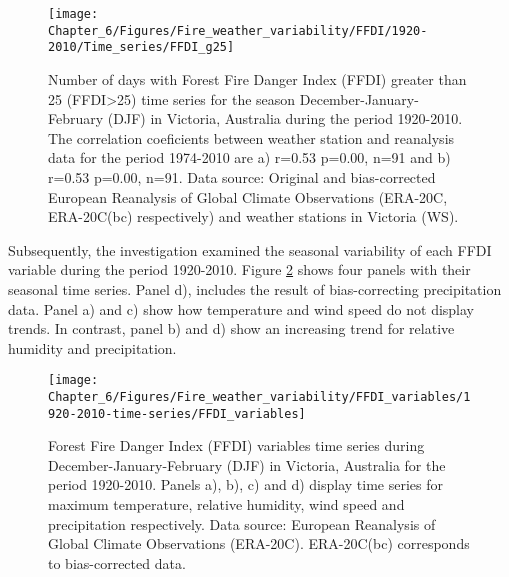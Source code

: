 \begin{figure}[h]
\noindent \begin{centering}
\texttt{[image: Chapter\_6/Figures/Fire\_weather\_variability/FFDI/1920-2010/Time\_series/FFDI\_g25]}
\par\end{centering}

\caption[Number of days with Forest Fire Danger Index (FFDI) greater than 25
(FFDI\protect\textsubscript{>25}) time series for the season December-January-February (DJF)
in Victoria, Australia during the period 1920-2010]{Number of days with Forest Fire Danger Index (FFDI) greater than 25
(FFDI>25) time series for the season December-January-February (DJF)
in Victoria, Australia during the period 1920-2010. The correlation
coeficients between weather station and reanalysis data for the period
1974-2010 are a) r=0.53 p=0.00, n=91 and b) r=0.53 p=0.00, n=91. Data
source: Original and bias-corrected European Reanalysis of Global
Climate Observations (ERA-20C, ERA-20C(bc) respectively) and weather
stations in Victoria (WS). \label{fig:Number of days with Forest Fire Danger Index greater than 25 time series for the season December-January-February in Victoria, Australia during the period 1920-2010 (r)}}
\end{figure}


Subsequently, the investigation examined the seasonal variability
of each FFDI variable during the period 1920-2010. Figure \ref{fig:Forest Fire Danger Index variables time series during December-January-February in Victoria, Australia for the period 1920-2010 (r)}
shows four panels with their seasonal time series. Panel d), includes
the result of bias-correcting precipitation data. Panel a) and c)
show how temperature and wind speed do not display trends. In contrast,
panel b) and d) show an increasing trend for relative humidity and
precipitation.

\begin{figure}[h]
\noindent \begin{centering}
\texttt{[image: Chapter\_6/Figures/Fire\_weather\_variability/FFDI\_variables/1920-2010-time-series/FFDI\_variables]}
\par\end{centering}

\caption[Forest Fire Danger Index (FFDI) variables time series during December-January-February
(DJF) in Victoria, Australia for the period 1920-2010]{Forest Fire Danger Index (FFDI) variables time series during December-January-February
(DJF) in Victoria, Australia for the period 1920-2010. Panels a),
b), c) and d) display time series for maximum temperature, relative
humidity, wind speed and precipitation respectively. Data source:
European Reanalysis of Global Climate Observations (ERA-20C). ERA-20C(bc)
corresponds to bias-corrected data. \label{fig:Forest Fire Danger Index variables time series during December-January-February in Victoria, Australia for the period 1920-2010 (r)}}
\end{figure}




